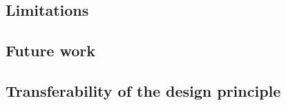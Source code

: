 \subsection{Limitations}
\label{sec:limitations}

\subsection{Future work}
\label{sec:future}

\subsection{Transferability of the design principle}
\label{sec:transferability}

